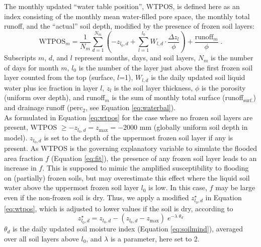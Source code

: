 The monthly updated ``water table position'', WTPOS, is defined here as an index consisting of the monthly mean water-filled pore space, the monthly total runoff, and the ``actual'' soil depth, modified by the presence of frozen soil layers:
\begin{equation}
  \text{WTPOS}_m = \frac{1}{N_m} \sum_{d=1}^{N_m} ( -z_{l_0,d} + \sum_{l=1}^{l_0} W_{l,d} \cdot \frac{\Delta z_l}{\phi} ) + \frac{\text{runoff}_m}{\phi} \; .
\label{eq:wtpos}
\end{equation}
Subscripts $m$, $d$, and $l$ represent months, days, and soil layers, $N_m$ is the number of days for month $m$, $l_0$ is the number of the layer just above the first frozen soil layer counted from the top (surface, $l$=1), $W_{l,d}$ is the daily updated soil liquid water plus ice fraction in layer $l$, $z_l$ is the soil layer thickness, $\phi$ is the porosity (uniform over depth), and runoff$_m$ is the sum of monthly total surface (runoff$_{\text{surf.}}$) and drainage runoff (perc$_2$, see Equation \ref{eq:waterbal}).\\

As formulated in Equation \ref{eq:wtpos} for the case where no frozen soil layers are present, WTPOS $\ge -z_{l_0,d} = z_{\text{max}} = -2000$ mm (globally uniform soil depth in model). $z_{l_0,d}$ is set to the depth of the uppermost frozen soil layer if any is present. As WTPOS is the governing explanatory variable to simulate the flooded area fraction $f$ (Equation \ref{eq:fit}), the presence of any frozen soil layer leads to an increase in $f$. This is supposed to mimic the amplified susceptibility to flooding on (partially) frozen soils, but may overestimate this effect where the liquid soil water above the uppermost frozen soil layer $l_0$ is low. In this case, $f$ may be large even if the non-frozen soil is dry. Thus, we apply a modified $z_{l_0,d}^{\star}$ in Equation \ref{eq:wtpos}, which is adjusted to lower values if the soil is dry, according to
\begin{equation}
z_{l_0,d}^{\star} = z_{l_0,d} - (z_{l_0,d}-z_{\text{max}})\;e^{-\lambda\;\theta_d}
\label{eq:thawd}
\end{equation}
$\theta_d$ is the daily updated soil moisture index (Equation \ref{eq:soilmind}), averaged over all soil layers above $l_0$, and $\lambda$ is a parameter, here set to 2. \\

